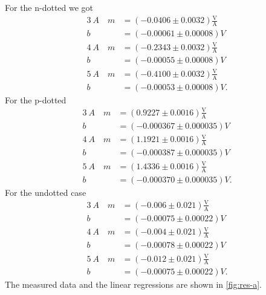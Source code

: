 For the n-dotted we got
\begin{align*}
  \SI{3}{A} \quad m &= (-0.0406 \pm 0.0032) \frac{\text{V}}{\text{A}} \\
                  b &= (-0.00061 \pm 0.00008) \si{V} \\
  \SI{4}{A} \quad m &= (-0.2343 \pm 0.0032) \frac{\text{V}}{\text{A}} \\
                  b &= (-0.00055 \pm 0.00008) \si{V} \\
  \SI{5}{A} \quad m &= (-0.4100 \pm 0.0032) \frac{\text{V}}{\text{A}} \\
                  b &= (-0.00053 \pm 0.00008) \si{V}.
\end{align*}
For the p-dotted
\begin{align*}
  \SI{3}{A} \quad m &= (0.9227 \pm 0.0016) \frac{\text{V}}{\text{A}} \\
                  b &= (-0.000367 \pm 0.000035) \si{V} \\
  \SI{4}{A} \quad m &= (1.1921 \pm 0.0016) \frac{\text{V}}{\text{A}} \\
                  b &= (-0.000387 \pm 0.000035) \si{V} \\
  \SI{5}{A} \quad m &= (1.4336 \pm 0.0016) \frac{\text{V}}{\text{A}} \\
                  b &= (-0.000370 \pm 0.000035) \si{V}.
\end{align*}
For the undotted case
\begin{align*}
  \SI{3}{A} \quad m &= (-0.006 \pm 0.021) \frac{\text{V}}{\text{A}} \\
                  b &= (-0.00075 \pm 0.00022) \si{V} \\
  \SI{4}{A} \quad m &= (-0.004 \pm 0.021) \frac{\text{V}}{\text{A}} \\
                  b &= (-0.00078 \pm 0.00022) \si{V} \\
  \SI{5}{A} \quad m &= (-0.012 \pm 0.021) \frac{\text{V}}{\text{A}} \\
                  b &= (-0.00075 \pm 0.00022) \si{V}.
\end{align*}
The measured data and the linear regressions are shown in \autoref{fig:res-a}.

